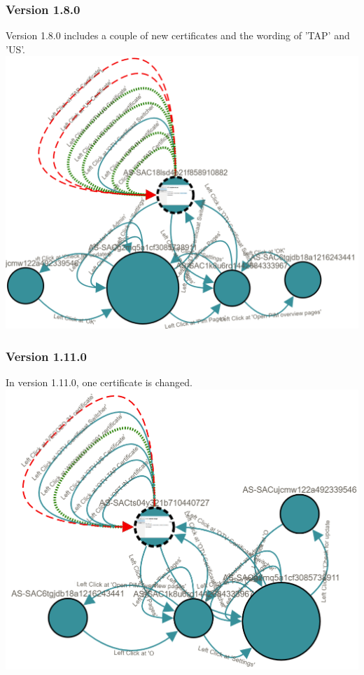 \subsubsection{Version 1.8.0}
Version 1.8.0 includes a couple of new certificates and the wording of 'TAP' and 'US'. 
\\
\begingroup
\captionsetup{type=figure}
\includegraphics[scale=0.5]{images/6-Experiment/1_7_1-1_8_0.png}
\label{fig:1_7_1-1_8_0}
\endgroup

\subsubsection{Version 1.11.0}
In version 1.11.0, one certificate is changed. 
\\
\begingroup
\captionsetup{type=figure}
\includegraphics[scale=0.5]{images/6-Experiment/1_8_0-1_11_0.png}
\label{fig:1_8_0-1_11_0}
\endgroup
